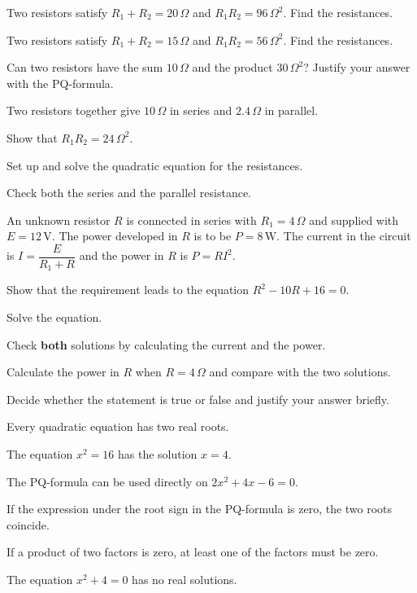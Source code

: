 \begin{parts}
  \item Two resistors satisfy $R_1 + R_2 = 20\,\Omega$ and $R_1 R_2 = 96\,\Omega^2$. Find the
    resistances.
  \item Two resistors satisfy $R_1 + R_2 = 15\,\Omega$ and $R_1 R_2 = 56\,\Omega^2$. Find the
    resistances.
  \item Can two resistors have the sum $10\,\Omega$ and the product $30\,\Omega^2$? Justify your
    answer with the PQ-formula.
\end{parts}

Two resistors together give $10\,\Omega$ in series and $2.4\,\Omega$ in parallel.
\begin{parts}
  \item Show that $R_1 R_2 = 24\,\Omega^2$.
  \item Set up and solve the quadratic equation for the resistances.
  \item Check both the series and the parallel resistance.
\end{parts}

An unknown resistor $R$ is connected in series with $R_1 = 4\,\Omega$ and supplied with
$E = 12\,\text{V}$. The power developed in $R$ is to be $P = 8\,\text{W}$. The current in the
circuit is $I = \dfrac{E}{R_1 + R}$ and the power in $R$ is $P = RI^2$.
\begin{parts}
  \item Show that the requirement leads to the equation $R^2 - 10R + 16 = 0$.
  \item Solve the equation.
  \item Check \textbf{both} solutions by calculating the current and the power.
  \item Calculate the power in $R$ when $R = 4\,\Omega$ and compare with the two solutions.
\end{parts}

Decide whether the statement is true or false and justify your answer briefly.
\begin{parts}
  \item Every quadratic equation has two real roots.
  \item The equation $x^2 = 16$ has the solution $x = 4$.
  \item The PQ-formula can be used directly on $2x^2 + 4x - 6 = 0$.
  \item If the expression under the root sign in the PQ-formula is zero, the two roots coincide.
  \item If a product of two factors is zero, at least one of the factors must be zero.
  \item The equation $x^2 + 4 = 0$ has no real solutions.
\end{parts}
